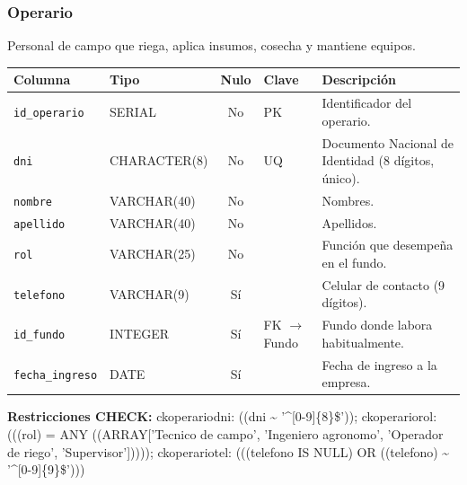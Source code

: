 \documentclass[11pt,letterpaper]{article}
\newcommand{\tbus}{\textunderscore\allowbreak}
\newcommand{\tb}[1]{{\ttfamily\let\_\tbus #1}}
\begin{document}
\subsubsection*{Operario}
Personal de campo que riega, aplica insumos, cosecha y mantiene equipos.
{\footnotesize
\begin{longtable}{>{\raggedright\arraybackslash}p{3.3cm}>{\raggedright\arraybackslash}p{2.5cm}c>{\raggedright\arraybackslash}p{2.2cm}>{\raggedright\arraybackslash}p{6.1cm}}
\toprule
\textbf{Columna} & \textbf{Tipo} & \textbf{Nulo} & \textbf{Clave} & \textbf{Descripción} \\
\midrule
\endhead
\texttt{id\_operario} & SERIAL & No & PK & Identificador del operario. \\
\texttt{dni} & CHARACTER(8) & No & UQ & Documento Nacional de Identidad (8 dígitos, único). \\
\texttt{nombre} & VARCHAR(40) & No &  & Nombres. \\
\texttt{apellido} & VARCHAR(40) & No &  & Apellidos. \\
\texttt{rol} & VARCHAR(25) & No &  & Función que desempeña en el fundo. \\
\texttt{telefono} & VARCHAR(9) & Sí &  & Celular de contacto (9 dígitos). \\
\texttt{id\_fundo} & INTEGER & Sí & FK $\to$ Fundo & Fundo donde labora habitualmente. \\
\texttt{fecha\_ingreso} & DATE & Sí &  & Fecha de ingreso a la empresa. \\
\bottomrule
\end{longtable}}
{\footnotesize\raggedright\textbf{Restricciones CHECK:} \tb{ck\_operario\_dni}: \tb{((dni \textasciitilde{} '\textasciicircum{}[0-9]\{8\}\$'))}; \tb{ck\_operario\_rol}: \tb{(((rol) = ANY ((ARRAY['Tecnico de campo', 'Ingeniero agronomo', 'Operador de riego', 'Supervisor']))))}; \tb{ck\_operario\_tel}: \tb{(((telefono IS NULL) OR ((telefono) \textasciitilde{} '\textasciicircum{}[0-9]\{9\}\$')))}\par}
\medskip
\end{document}
